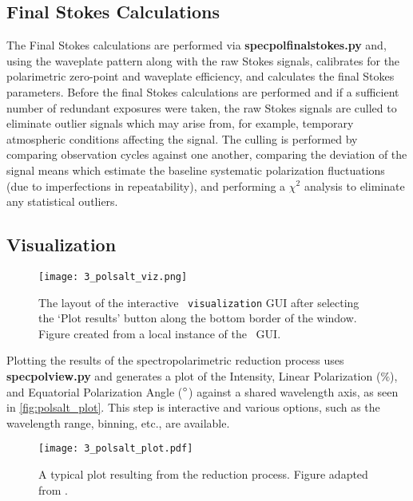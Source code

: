 \subsection{Final Stokes Calculations}

The Final Stokes calculations are performed via \textbf{specpolfinalstokes.py} and, using the waveplate pattern along with the raw Stokes signals, calibrates for the polarimetric zero-point and waveplate efficiency, and calculates the final Stokes parameters. Before the final Stokes calculations are performed and if a sufficient number of redundant exposures were taken, the raw Stokes signals are culled to eliminate outlier signals which may arise from, for example, temporary atmospheric conditions affecting the signal. The culling is performed by comparing observation cycles against one another, comparing the deviation of the signal means which estimate the baseline systematic polarization fluctuations (due to imperfections in repeatability), and performing a $\chi^2$ analysis to eliminate any statistical outliers.

\subsection{Visualization}

\begin{figure}[t]
    \centering
    \texttt{[image: 3\_polsalt\_viz.png]}
    \caption{The layout of the interactive \polsalt\ \texttt{visualization} \gls{GUI} after selecting the `Plot results' button along the bottom border of the window. Figure created from a local instance of the \polsalt\ \gls{GUI}.}
    \label{fig:polsalt_gui_vis}
\end{figure}

Plotting the results of the spectropolarimetric reduction process uses \textbf{specpolview.py} and generates a plot of the Intensity, Linear Polarization ($\%$), and Equatorial Polarization Angle ($\hbox{$^\circ$}$) against a shared wavelength axis, as seen in \autoref{fig:polsalt_plot}. This step is interactive and various options, such as the wavelength range, binning, etc., are available.

\begin{figure}[t]
    \centering
    \texttt{[image: 3\_polsalt\_plot.pdf]}
    \caption{A typical plot resulting from the reduction process. Figure adapted from \citep{cooper_HEASA2022}.}
    \label{fig:polsalt_plot}
\end{figure}

